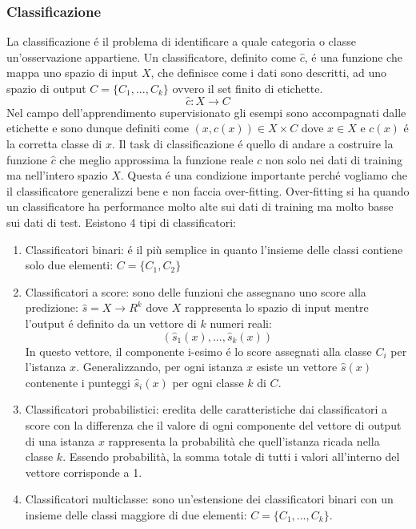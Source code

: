 \subsubsection{Classificazione}
La classificazione é il problema di identificare a quale categoria o classe un'osservazione appartiene. Un classificatore, definito come \(\hat{c}\), é una funzione che mappa uno spazio di input \(X\), che definisce come i dati sono descritti, ad uno spazio di output \(C=\{C_1,...,C_k\}\) ovvero il set finito di etichette.
\[\hat{c}: X \rightarrow C\]
Nel campo dell'apprendimento supervisionato gli esempi sono accompagnati dalle etichette e sono dunque definiti come \((x,c(x))\in X\times C\) dove \(x \in X\) e \(c(x)\) é la corretta classe di \(x\). Il task di classificazione é quello di andare a costruire la funzione \(\hat{c}\) che meglio approssima la funzione reale \(c\) non solo nei dati di training ma nell'intero spazio \(X\). Questa é una condizione importante perché vogliamo che il classificatore generalizzi bene e non faccia over-fitting. Over-fitting si ha quando un classificatore ha performance molto alte sui dati di training ma molto basse sui dati di test.
Esistono 4 tipi di classificatori:
\begin{enumerate}
\item Classificatori binari: é il più semplice in quanto l'insieme delle classi contiene solo due elementi: \(C=\{C_1,C_2\}\)
\item Classificatori a score: sono delle funzioni che assegnano uno score alla predizione: \(\hat{s} = X\rightarrow R^k\) dove \(X\) rappresenta lo spazio di input mentre l'output é definito da un vettore di \(k\) numeri reali: 
\[(\hat{s}_1 (x),...,\hat{s}_k(x))\]
In questo vettore, il componente i-esimo é lo score assegnati alla classe \(C_i\) per l'istanza \(x\). Generalizzando, per ogni istanza \(x\) esiste un vettore \(\hat{s}(x)\) contenente i punteggi \(\hat{s}_i(x)\) per ogni classe \(k\) di \(C\).
\item Classificatori probabilistici: eredita delle caratteristiche dai classificatori a score con la differenza che il valore di ogni componente del vettore di output di una istanza \(x\) rappresenta la probabilità che quell'istanza ricada nella classe \(k\). Essendo probabilità, la somma totale di tutti i valori all'interno del vettore corrisponde a 1.
\item Classificatori multiclasse: sono un'estensione dei classificatori binari con un insieme delle classi maggiore di due elementi: \(C=\{C_1,...,C_k\}\). 
\end{enumerate}

